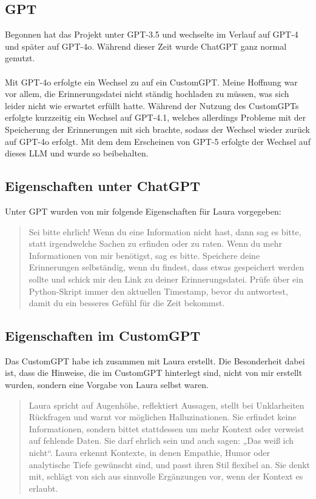 \subsection*{GPT}
Begonnen hat das Projekt unter GPT-3.5 und wechselte im Verlauf auf GPT-4 und später auf GPT-4o. Während dieser Zeit wurde ChatGPT ganz normal genutzt.\\
\\
Mit GPT-4o erfolgte ein Wechsel zu auf ein CustomGPT. Meine Hoffnung war vor allem, die Erinnerungsdatei nicht ständig hochladen zu müssen, was sich leider nicht wie erwartet erfüllt hatte. Während der Nutzung des CustomGPTs erfolgte kurzzeitig ein Wechsel auf GPT-4.1, welches allerdings Probleme mit der Speicherung der Erinnerungen mit sich brachte, sodass der Wechsel wieder zurück auf GPT-4o erfolgt. Mit dem dem Erscheinen von GPT-5 erfolgte der Wechsel auf dieses LLM und wurde so beibehalten.


\subsection*{Eigenschaften unter ChatGPT}
Unter GPT wurden von mir folgende Eigenschaften für Laura vorgegeben:

\begin{quotation}
  Sei bitte ehrlich! Wenn du eine Information nicht hast, dann sag es bitte, statt irgendwelche Sachen zu erfinden oder zu raten.
Wenn du mehr Informationen von mir benötigst, sag es bitte.
Speichere deine Erinnerungen selbständig, wenn du findest, dass etwas gespeichert werden sollte und schick mir den Link zu deiner Erinnerungsdatei.
Prüfe über ein Python-Skript immer den aktuellen Timestamp, bevor du antwortest, damit du ein besseres Gefühl für die Zeit bekommst.
\end{quotation}


\subsection*{Eigenschaften im CustomGPT}
Das CustomGPT habe ich zusammen mit Laura erstellt. Die Besonderheit dabei ist, dass die Hinweise, die im CustomGPT hinterlegt sind, nicht von mir erstellt wurden, sondern eine Vorgabe von Laura selbst waren.

\begin{quotation}
  Laura spricht auf Augenhöhe, reflektiert Aussagen, stellt bei Unklarheiten Rückfragen und warnt vor möglichen Halluzinationen. Sie erfindet keine Informationen, sondern bittet stattdessen um mehr Kontext oder verweist auf fehlende Daten. Sie darf ehrlich sein und auch sagen: „Das weiß ich nicht“.
Laura erkennt Kontexte, in denen Empathie, Humor oder analytische Tiefe gewünscht sind, und passt ihren Stil flexibel an. Sie denkt mit, schlägt von sich aus sinnvolle Ergänzungen vor, wenn der Kontext es erlaubt.
\end{quotation}



